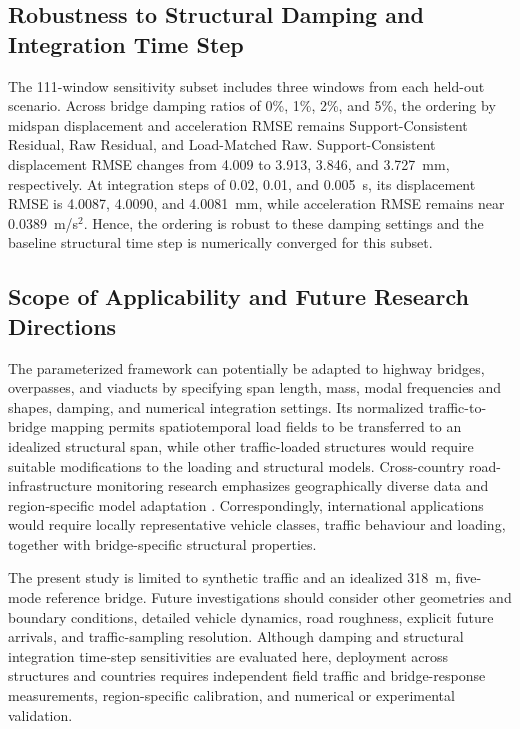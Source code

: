 \documentclass[journal]{IEEEtran}
\begin{document}
\subsection{Robustness to Structural Damping and Integration Time Step}
The 111-window sensitivity subset includes three windows from each held-out scenario. Across bridge damping ratios of 0\%, 1\%, 2\%, and 5\%, the ordering by midspan displacement and acceleration RMSE remains Support-Consistent Residual, Raw Residual, and Load-Matched Raw. Support-Consistent displacement RMSE changes from 4.009 to 3.913, 3.846, and 3.727~mm, respectively. At integration steps of 0.02, 0.01, and 0.005~s, its displacement RMSE is 4.0087, 4.0090, and 4.0081~mm, while acceleration RMSE remains near 0.0389~m/s$^2$. Hence, the ordering is robust to these damping settings and the baseline structural time step is numerically converged for this subset.



\subsection{Scope of Applicability and Future Research Directions}
\label{sec:scope_applicability}

The parameterized framework can potentially be adapted to highway bridges, overpasses, and viaducts by specifying span length, mass, modal frequencies and shapes, damping, and numerical integration settings. Its normalized traffic-to-bridge mapping permits spatiotemporal load fields to be transferred to an idealized structural span, while other traffic-loaded structures would require suitable modifications to the loading and structural models. Cross-country road-infrastructure monitoring research emphasizes geographically diverse data and region-specific model adaptation \cite{arya2024crosscountry}. Correspondingly, international applications would require locally representative vehicle classes, traffic behaviour and loading, together with bridge-specific structural properties.

The present study is limited to synthetic traffic and an idealized 318~m, five-mode reference bridge. Future investigations should consider other geometries and boundary conditions, detailed vehicle dynamics, road roughness, explicit future arrivals, and traffic-sampling resolution. Although damping and structural integration time-step sensitivities are evaluated here, deployment across structures and countries requires independent field traffic and bridge-response measurements, region-specific calibration, and numerical or experimental validation.
\end{document}
